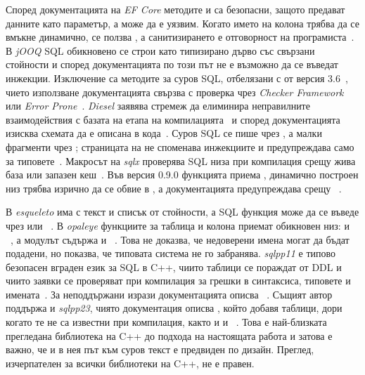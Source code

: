 Според документацията на \textit{EF Core} методите  и
 са безопасни, защото предават данните като параметър, а
 може да е уязвим. Когато името на колона трябва да се вмъкне
динамично, се ползва , а санитизирането е отговорност на
програмиста~\cite{ef_core_sql}. В \textit{jOOQ} SQL обикновено се строи като типизирано дърво със
свързани стойности и според документацията по този път не е възможно да се въведат инжекции. Изключение
са методите за суров SQL, отбелязани с  от версия 3.6~\cite{jooq_sqli},
чието използване документацията свързва с проверка чрез \textit{Checker Framework} или
\textit{Error Prone}~\cite{jooq_plain_sql}. \textit{Diesel} заявява стремеж да
елиминира неправилните взаимодействия с базата на етапа на компилацията~\cite{diesel_site}
и според документацията изисква схемата да е описана в кода~\cite{diesel_crate}. Суров
SQL се пише чрез , а малки фрагменти чрез ; страницата на
 не споменава инжекциите и предупреждава само за типовете~\cite{diesel_sql_query}.
Макросът  на \textit{sqlx} проверява SQL низа при компилация срещу жива
база или запазен кеш~\cite{sqlx_readme}. Във версия 0.9.0 функцията 
приема , динамично построен низ трябва изрично да се обвие в
, а документацията предупреждава срещу ~\cite{sqlx_query_docs}.

В \textit{esqueleto} има  с текст и списък от стойности, а SQL функция
може да се въведе чрез  или ~\cite{esqueleto_hackage}.
В \textit{opaleye} функциите за таблица и колона приемат обикновен низ:
 и ~\cite{opaleye_table},
а модулът съдържа и ~\cite{opaleye_main}. Това не
доказва, че недоверени имена могат да бъдат подадени, но показва, че типовата система
не го забранява. \textit{sqlpp11} е типово безопасен вграден език за SQL в C++, чиито
таблици се пораждат от DDL и чиито заявки се проверяват при компилация за грешки в
синтаксиса, типовете и имената~\cite{sqlpp11_repo}. За неподдържани изрази
документацията описва ~\cite{sqlpp11_functions}. Същият автор
поддържа и \textit{sqlpp23}, чиято документация описва , който
добавя таблици, дори когато те не са известни при компилация, както и  и
~\cite{sqlpp23_custom,sqlpp23_repo}. Това е най-близката
прегледана библиотека на C++ до подхода на настоящата работа и затова е важно, че и в
нея път към суров текст е предвиден по дизайн. Преглед, изчерпателен за всички
библиотеки на C++, не е правен.

